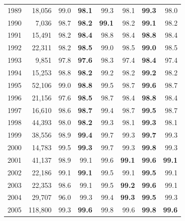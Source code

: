 {\begin{longtable}{rrrrrrrr}
1989 & 18,056 & \cellcolor{gray!15}99.0 & \cellcolor{gray!15}\textbf{98.1} & 99.3 & 98.1 & \textbf{99.3} & 98.0 \\
1990 & 7,036 & \cellcolor{gray!15}98.7 & \cellcolor{gray!15}\textbf{98.2} & \textbf{99.1} & 98.2 & \textbf{99.1} & 98.2 \\
1991 & 15,491 & \cellcolor{gray!15}98.2 & \cellcolor{gray!15}\textbf{98.4} & 98.8 & 98.4 & \textbf{98.8} & 98.4 \\
1992 & 22,311 & \cellcolor{gray!15}98.2 & \cellcolor{gray!15}\textbf{98.5} & 99.0 & 98.5 & \textbf{99.0} & 98.5 \\
1993 & 9,851 & \cellcolor{gray!15}97.8 & \cellcolor{gray!15}\textbf{97.6} & 98.3 & 97.4 & \textbf{98.4} & 97.4 \\
1994 & 15,253 & \cellcolor{gray!15}98.8 & \cellcolor{gray!15}\textbf{98.2} & 99.2 & 98.2 & \textbf{99.2} & 98.2 \\
1995 & 52,106 & \cellcolor{gray!15}99.0 & \cellcolor{gray!15}\textbf{98.8} & 99.5 & 98.7 & \textbf{99.6} & 98.7 \\
1996 & 21,156 & \cellcolor{gray!15}97.6 & \cellcolor{gray!15}\textbf{98.5} & 98.7 & 98.4 & \textbf{98.8} & 98.4 \\
1997 & 16,610 & \cellcolor{gray!15}98.6 & \cellcolor{gray!15}\textbf{98.7} & 99.4 & 98.7 & \textbf{99.5} & 98.7 \\
1998 & 44,393 & \cellcolor{gray!15}98.0 & \cellcolor{gray!15}\textbf{98.2} & 99.3 & 98.1 & \textbf{99.3} & 98.1 \\
1999 & 38,556 & \cellcolor{gray!15}98.9 & \cellcolor{gray!15}\textbf{99.4} & 99.7 & 99.3 & \textbf{99.7} & 99.3 \\
2000 & 14,783 & \cellcolor{gray!15}99.5 & \cellcolor{gray!15}\textbf{99.3} & 99.7 & 99.3 & \textbf{99.8} & 99.3 \\
2001 & 41,137 & \cellcolor{gray!15}98.9 & \cellcolor{gray!15}99.1 & 99.6 & \textbf{99.1} & \textbf{99.6} & \textbf{99.1} \\
2002 & 22,186 & \cellcolor{gray!15}99.1 & \cellcolor{gray!15}\textbf{99.1} & 99.5 & 99.1 & \textbf{99.5} & 99.1 \\
2003 & 22,353 & \cellcolor{gray!15}98.6 & \cellcolor{gray!15}99.1 & 99.5 & \textbf{99.2} & \textbf{99.6} & 99.1 \\
2004 & 29,707 & \cellcolor{gray!15}96.0 & \cellcolor{gray!15}99.3 & 99.4 & \textbf{99.3} & \textbf{99.5} & 99.3 \\
2005 & 118,800 & 99.3 & \textbf{99.6} & \cellcolor{gray!15}99.8 & \cellcolor{gray!15}99.6 & \textbf{99.8} & \textbf{99.6} \\

\end{longtable}}
